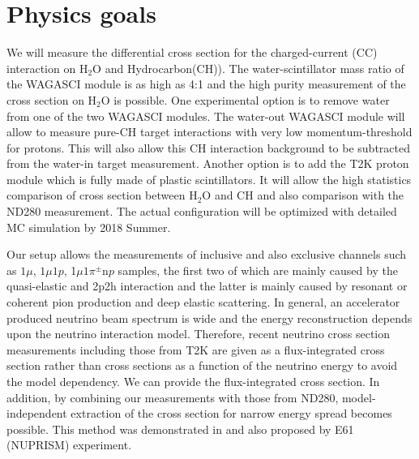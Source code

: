 \section{Physics goals}
We will measure the differential cross section for the charged-current (CC) interaction on $\mathrm{H_2O}$ and Hydrocarbon(CH)).
The water-scintillator mass ratio of the WAGASCI module is as high as 4:1 and the high purity measurement
of the cross section on $\mathrm{H_2O}$ is possible.
One experimental option is to remove water from one of the two WAGASCI modules. 
The water-out WAGASCI module will allow to measure pure-CH target interactions with very low momentum-threshold for protons.
This will also allow this CH interaction background to be subtracted from the water-in target measurement.
Another option is to add the T2K proton module which is fully made of plastic scintillators.
It will allow the high statistics comparison of cross section between $\mathrm{H_2O}$ and CH and also comparison
with the ND280 measurement. 
The actual configuration will be optimized with detailed MC simulation by 2018 Summer.


Our setup allows the measurements of inclusive and also exclusive channels such as
$1\mu$, $1\mu 1p$, 1$\mu 1\pi^\pm \mathrm{n}p$ samples, the first two of which are mainly caused by the quasi-elastic and
2p2h interaction and the latter is mainly caused by resonant or coherent pion production and deep elastic scattering.
In general, an accelerator produced neutrino beam spectrum is wide and the energy reconstruction
depends upon the neutrino interaction model.
Therefore, recent neutrino cross section measurements including those from T2K are given
as a flux-integrated cross section rather than cross sections as a function of the neutrino energy to avoid the model dependency.
We can provide the flux-integrated cross section.
In addition, by combining our measurements with those from ND280, model-independent extraction of the cross section
for narrow energy spread becomes possible.
This method was demonstrated in \cite{Abe:2015biq} and also proposed by E61 (NUPRISM) experiment.


